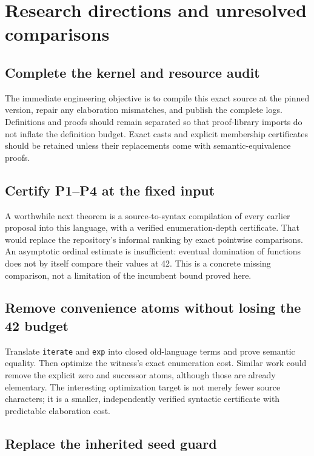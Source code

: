 \documentclass[11pt]{article}
\theoremstyle{definition}
\theoremstyle{remark}
\newcommand{\code}[1]{\texttt{#1}}
\begin{document}
\section{Research directions and unresolved comparisons}

\subsection{Complete the kernel and resource audit}

The immediate engineering objective is to compile this exact source at the
pinned version, repair any elaboration mismatches, and publish the complete
logs. Definitions and proofs should remain separated so that proof-library
imports do not inflate the definition budget. Exact casts and explicit
membership certificates should be retained unless their replacements come
with semantic-equivalence proofs.

\subsection{Certify P1--P4 at the fixed input}

A worthwhile next theorem is a source-to-syntax compilation of every earlier
proposal into this language, with a verified enumeration-depth certificate.
That would replace the repository's informal ranking by exact pointwise
comparisons. An asymptotic ordinal estimate is insufficient: eventual
domination of functions does not by itself compare their values at 42.
This is a concrete missing comparison, not a limitation of the incumbent
bound proved here.

\subsection{Remove convenience atoms without losing the 42 budget}

Translate \code{iterate} and \code{exp} into closed old-language terms and
prove semantic equality. Then optimize the witness's exact enumeration
cost. Similar work could remove the explicit zero and successor atoms,
although those are already elementary. The interesting optimization target
is not merely fewer source characters; it is a smaller, independently
verified syntactic certificate with predictable elaboration cost.

\subsection{Replace the inherited seed guard}
\end{document}
